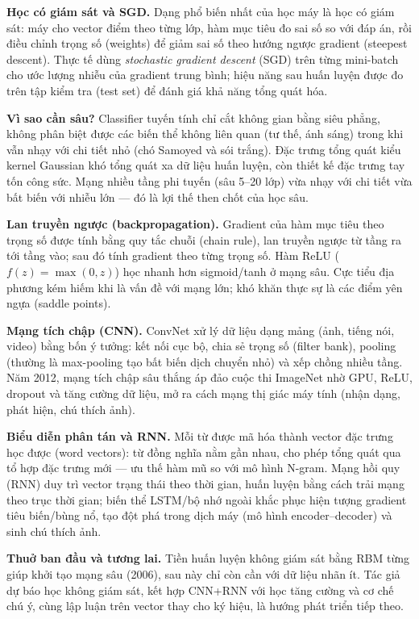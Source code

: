 \documentclass[a4paper,12pt]{article}
\begin{document}
\textbf{Học có giám sát và SGD.} Dạng phổ biến nhất của học máy là học có giám sát: máy cho vector điểm theo từng lớp, hàm mục tiêu đo sai số so với đáp án, rồi điều chỉnh trọng số (weights) để giảm sai số theo hướng ngược gradient (steepest descent). Thực tế dùng \textit{stochastic gradient descent} (SGD) trên từng mini-batch cho ước lượng nhiễu của gradient trung bình; hiệu năng sau huấn luyện được đo trên tập kiểm tra (test set) để đánh giá khả năng tổng quát hóa.

\textbf{Vì sao cần sâu?} Classifier tuyến tính chỉ cắt không gian bằng siêu phẳng, không phân biệt được các biến thể không liên quan (tư thế, ánh sáng) trong khi vẫn nhạy với chi tiết nhỏ (chó Samoyed và sói trắng). Đặc trưng tổng quát kiểu kernel Gaussian khó tổng quát xa dữ liệu huấn luyện, còn thiết kế đặc trưng tay tốn công sức. Mạng nhiều tầng phi tuyến (sâu 5--20 lớp) vừa nhạy với chi tiết vừa bất biến với nhiễu lớn --- đó là lợi thế then chốt của học sâu.

\textbf{Lan truyền ngược (backpropagation).} Gradient của hàm mục tiêu theo trọng số được tính bằng quy tắc chuỗi (chain rule), lan truyền ngược từ tầng ra tới tầng vào; sau đó tính gradient theo từng trọng số. Hàm ReLU ($f(z)=\max(0,z)$) học nhanh hơn sigmoid/tanh ở mạng sâu. Cực tiểu địa phương kém hiếm khi là vấn đề với mạng lớn; khó khăn thực sự là các điểm yên ngựa (saddle points).

\textbf{Mạng tích chập (CNN).} ConvNet xử lý dữ liệu dạng mảng (ảnh, tiếng nói, video) bằng bốn ý tưởng: kết nối cục bộ, chia sẻ trọng số (filter bank), pooling (thường là max-pooling tạo bất biến dịch chuyển nhỏ) và xếp chồng nhiều tầng. Năm 2012, mạng tích chập sâu thắng áp đảo cuộc thi ImageNet nhờ GPU, ReLU, dropout và tăng cường dữ liệu, mở ra cách mạng thị giác máy tính (nhận dạng, phát hiện, chú thích ảnh).

\textbf{Biểu diễn phân tán và RNN.} Mỗi từ được mã hóa thành vector đặc trưng học được (word vectors): từ đồng nghĩa nằm gần nhau, cho phép tổng quát qua tổ hợp đặc trưng mới --- ưu thế hàm mũ so với mô hình N-gram. Mạng hồi quy (RNN) duy trì vector trạng thái theo thời gian, huấn luyện bằng cách trải mạng theo trục thời gian; biến thể LSTM/bộ nhớ ngoài khắc phục hiện tượng gradient tiêu biến/bùng nổ, tạo đột phá trong dịch máy (mô hình encoder--decoder) và sinh chú thích ảnh.

\textbf{Thuở ban đầu và tương lai.} Tiền huấn luyện không giám sát bằng RBM từng giúp khởi tạo mạng sâu (2006), sau này chỉ còn cần với dữ liệu nhãn ít. Tác giả dự báo học không giám sát, kết hợp CNN+RNN với học tăng cường và cơ chế chú ý, cùng lập luận trên vector thay cho ký hiệu, là hướng phát triển tiếp theo.
\end{document}
